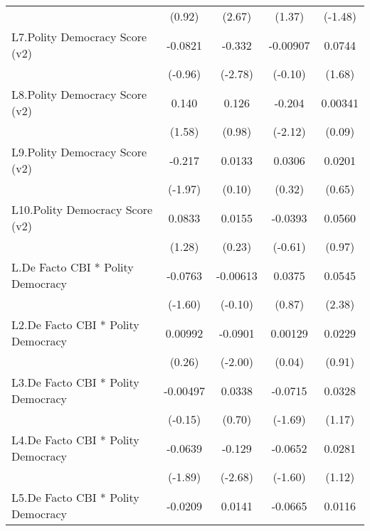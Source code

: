 {\begin{longtable}{l*{4}{c}}
                &   (0.92)         &   (2.67)         &   (1.37)         &  (-1.48)         \\
[1em]
L7.Polity Democracy Score (v2)&  -0.0821         &   -0.332\sym{**} & -0.00907         &   0.0744         \\
                &  (-0.96)         &  (-2.78)         &  (-0.10)         &   (1.68)         \\
[1em]
L8.Polity Democracy Score (v2)&    0.140         &    0.126         &   -0.204\sym{*}  &  0.00341         \\
                &   (1.58)         &   (0.98)         &  (-2.12)         &   (0.09)         \\
[1em]
L9.Polity Democracy Score (v2)&   -0.217\sym{*}  &   0.0133         &   0.0306         &   0.0201         \\
                &  (-1.97)         &   (0.10)         &   (0.32)         &   (0.65)         \\
[1em]
L10.Polity Democracy Score (v2)&   0.0833         &   0.0155         &  -0.0393         &   0.0560         \\
                &   (1.28)         &   (0.23)         &  (-0.61)         &   (0.97)         \\
[1em]
L.De Facto CBI * Polity Democracy&  -0.0763         & -0.00613         &   0.0375         &   0.0545\sym{*}  \\
                &  (-1.60)         &  (-0.10)         &   (0.87)         &   (2.38)         \\
[1em]
L2.De Facto CBI * Polity Democracy&  0.00992         &  -0.0901\sym{*}  &  0.00129         &   0.0229         \\
                &   (0.26)         &  (-2.00)         &   (0.04)         &   (0.91)         \\
[1em]
L3.De Facto CBI * Polity Democracy& -0.00497         &   0.0338         &  -0.0715         &   0.0328         \\
                &  (-0.15)         &   (0.70)         &  (-1.69)         &   (1.17)         \\
[1em]
L4.De Facto CBI * Polity Democracy&  -0.0639         &   -0.129\sym{**} &  -0.0652         &   0.0281         \\
                &  (-1.89)         &  (-2.68)         &  (-1.60)         &   (1.12)         \\
[1em]
L5.De Facto CBI * Polity Democracy&  -0.0209         &   0.0141         &  -0.0665         &   0.0116         \\

\end{longtable}}
